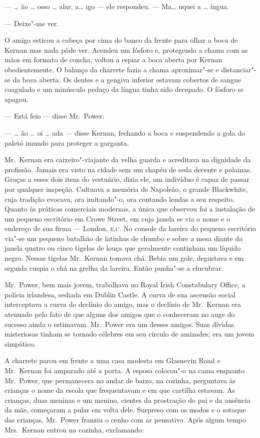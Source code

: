 --- \ldots{} ão \ldots{} osso \ldots{} alar, a\ldots{} igo --- ele respondeu.  ---
Ma\ldots{} uquei a \ldots{} íngua.

--- Deixe"-me ver.

O amigo esticou a cabeça por cima do banco da frente para olhar a boca de
Kernan mas nada pôde ver.  Acendeu um fósforo e, protegendo a chama com as mãos
em formato de concha, voltou a espiar a boca aberta por Kernan obedientemente.
O balanço da charrete fazia a chama aproximar"-se e distanciar"-se da boca
aberta.  Os dentes e a gengiva inferior estavam cobertos de sangue coagulado e
um minúsculo pedaço da língua tinha sido decepado.  O fósforo se apagou.

--- Está feio --- disse Mr.~Power.

--- \ldots{} ão \ldots{} oi \ldots{} ada --- disse Kernan, fechando a boca e
suspendendo a gola do paletó imundo para proteger a garganta.

Mr.~Kernan era caixeiro"-viajante da velha guarda e acreditava na dignidade da
profissão.  Jamais era visto na cidade sem um chapéu de seda decente e
polainas.  Graças a esses dois itens do vestuário, dizia ele, um indivíduo é
capaz de passar por qualquer inspeção.  Cultuava a memória de Napoleão, o
grande Blackwhite, cuja tradição evocava, ora imitando"-o, ora contando lendas a
seu respeito.  Quanto às práticas comerciais modernas, a única que observou foi
a instalação de um pequeno escritório em Crowe Street, em cuja janela se via o
nome e o endereço de sua firma --- London, \textsc{e.c.  }No console da lareira
do pequeno escritório via"-se um pequeno batalhão de latinhas de chumbo e sobre
a mesa diante da janela quatro ou cinco tigelas de louça que geralmente
continham um líquido negro.  Nessas tigelas Mr.~Kernan tomava chá.  Bebia um
gole, degustava e em seguida cuspia o chá na grelha da lareira.  Então punha"-se
a elucubrar.

Mr.~Power, bem mais jovem, trabalhava no Royal Irish Constabulary Office, a
polícia irlandesa, sediada em Dublin Castle.  A curva de sua ascensão social
interceptava a curva do declínio do amigo, mas o declínio de Mr.~Kernan era
atenuado pelo fato de que alguns dos amigos que o conheceram no auge do sucesso
ainda o estimavam.  Mr.~Power era um desses amigos.  Suas dívidas misteriosas
tinham se tornado célebres em seu círculo de amizades; era um jovem simpático.

A charrete parou em frente a uma casa modesta em Glasnevin Road e Mr.~Kernan
foi amparado até a porta.  A esposa colocou"-o na cama enquanto Mr.~Power, que
permanecera no andar de baixo, na cozinha, perguntava às crianças o nome da
escola que frequentavam e em que cartilha estavam.  As crianças, duas meninas e
um menino, cientes da prostração do pai e da ausência da mãe, começaram a pular
em volta dele.  Surpreso com os modos e o sotaque das crianças, Mr.~Power
franziu o cenho com ar pensativo.  Após algum tempo Mrs.~Kernan entrou na
cozinha, exclamando:

